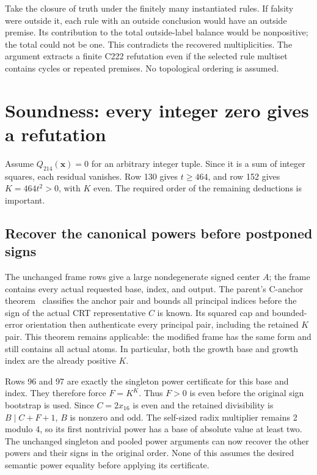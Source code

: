\documentclass[11pt,a4paper]{article}
\theoremstyle{definition}
\newcommand{\Qdiag}{Q_{214}}
\begin{document}
Take the closure of truth under the finitely many instantiated rules.
If falsity were outside it, each rule with an outside conclusion would
have an outside premise. Its contribution to the total outside-label
balance would be nonpositive; the total could not be one. This contradicts
the recovered multiplicities. The argument extracts a finite C222
refutation even if the selected rule multiset contains cycles or repeated
premises. No topological ordering is assumed.

\section{Soundness: every integer zero gives a refutation}\label{sec:soundness}

Assume $\Qdiag(\mathbf x)=0$ for an arbitrary integer tuple. Since it is
a sum of integer squares, each residual vanishes. Row 130 gives $t\ge464$,
and row 152 gives $K=464t^2>0$, with $K$ even. The required order of the
remaining deductions is important.

\subsection{Recover the canonical powers before postponed signs}

The unchanged frame rows give a large nondegenerate signed center $A$;
the frame contains every actual requested base, index, and output.
The parent's C-anchor theorem~\cite{parent173} classifies the anchor
pair and bounds all principal indices before the sign of the actual CRT
representative $C$ is known. Its squared cap and bounded-error orientation
then authenticate every principal pair, including the retained $K$ pair.
This theorem remains applicable: the modified frame has the same form
and still contains all actual atoms. In particular, both the growth base
and growth index are the already positive $K$.

Rows 96 and 97 are exactly the singleton power certificate for this
base and index. They therefore force $F=K^K$. Thus $F>0$ is even before
the original sign bootstrap is used. Since $C=2x_{16}$ is even and the
retained divisibility is $B\mid C+F+1$, $B$ is nonzero and odd. The
self-sized radix multiplier remains 2 modulo 4, so its first nontrivial
power has a base of absolute value at least two. The unchanged singleton
and pooled power arguments can now recover the other powers and their
signs in the original order. None of this assumes the desired semantic
power equality before applying its certificate.
\end{document}

